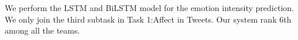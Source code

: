 We perform the LSTM and BiLSTM model for the emotion intensity prediction. We only join the third subtask in Task 1:Affect in Tweets. Our system rank 6th among all the teams.
